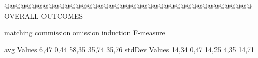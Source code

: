 @@@@@@@@@@@@@@@@@@@@@@@@@@@@@@@@@@@@@@@@@@@@@ OVERALL OUTCOMES

               matching commission   omission  induction  F-measure
               
avg Values      6,47       0,44       58,35      35,74     35,76        
stdDev Values    14,34       0,47       14,25     4,35      14,71        